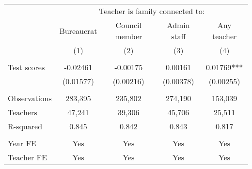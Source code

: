 \setlength{\pdfpagewidth}{8.5in} \setlength{\pdfpageheight}{11in}

\begin{tabular}{lcccc} \hline
 & \multicolumn{4}{c}{Teacher is family connected to:} \\
 & Bureaucrat & Council member & Admin staff & Any teacher \\
 & (1) & (2) & (3) & (4) \\
  \hline
 &  &  &  &  \\
Test scores  & -0.02461 & -0.00175 & 0.00161 & 0.01769*** \\
 & (0.01577) & (0.00216) & (0.00378) & (0.00255) \\
 &  &  &  &  \\
Observations & 283,395 & 235,802 & 274,190 & 153,039 \\
Teachers & 47,241 & 39,306 & 45,706 & 25,511 \\
R-squared & 0.845 & 0.842 & 0.843 & 0.817 \\
 &  &  &  &  \\
Year FE & Yes & Yes & Yes & Yes \\
 Teacher FE & Yes & Yes & Yes & Yes \\ \hline
\end{tabular}
